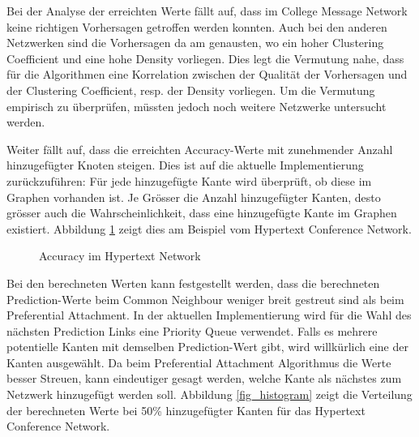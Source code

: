 Bei der Analyse der erreichten Werte fällt auf, dass im College Message Network keine richtigen Vorhersagen getroffen werden konnten.
Auch bei den anderen Netzwerken sind die Vorhersagen da am genausten, wo ein hoher Clustering Coefficient und eine hohe Density vorliegen.
Dies legt die Vermutung nahe, dass für die Algorithmen eine Korrelation zwischen der Qualität der Vorhersagen und der Clustering Coefficient, resp. der Density vorliegen.
Um die Vermutung empirisch zu überprüfen, müssten jedoch noch weitere Netzwerke untersucht werden.

Weiter fällt auf, dass die erreichten Accuracy-Werte mit zunehmender Anzahl hinzugefügter Knoten steigen.
Dies ist auf die aktuelle Implementierung zurückzuführen: Für jede hinzugefügte Kante wird überprüft, ob diese im Graphen vorhanden ist.
Je Grösser die Anzahl hinzugefügter Kanten, desto grösser auch die Wahrscheinlichkeit, dass eine hinzugefügte Kante im Graphen existiert.
Abbildung \ref{fig_hypertext} zeigt dies am Beispiel vom Hypertext Conference Network.

\begin{figure}[h]
\centering
{}
\label{fig_hypertext}
\caption{Accuracy im Hypertext Network}
\end{figure}

Bei den berechneten Werten kann festgestellt werden, dass die berechneten Prediction-Werte beim Common Neighbour weniger breit gestreut sind als beim Preferential Attachment.
In der aktuellen Implementierung wird für die Wahl des nächsten Prediction Links eine Priority Queue verwendet. Falls es mehrere potentielle Kanten mit demselben Prediction-Wert gibt, wird willkürlich eine der Kanten ausgewählt.
Da beim Preferential Attachment Algorithmus die Werte besser Streuen, kann eindeutiger gesagt werden, welche Kante als nächstes zum Netzwerk hinzugefügt werden soll.
Abbildung \ref{fig_histogram}
zeigt die Verteilung der berechneten Werte bei 50\% hinzugefügter Kanten für das Hypertext Conference Network.

